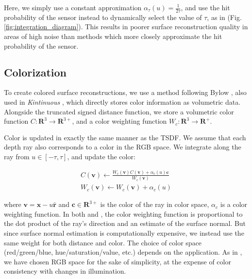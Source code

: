 \documentclass[10pt,twocolumn,letterpaper]{article}
\newcommand{\figref}[1]{Fig.\ref{#1}}
\begin{document}
Here, we simply use a constant approximation $\alpha_{\tau}(u) = \frac{1}{2
\tau}$, and use the hit probability of the sensor instead to  dynamically select
the value of $\tau$, as in \cite{Nguyen2012} (\figref{fig:integration_diagram}).
This results in poorer surface reconstruction quality in areas of high noise
than methods which more closely approximate the hit probability of the sensor.

\subsection{Colorization}
\label{section:color}
To create colored surface reconstructions, we use a method following Bylow
\etal \cite{Bylow2013}, also used in \textit{Kintinuous} \cite{Whelan2013},
which directly stores color information as volumetric data. Alongside the
truncated signed distance function, we store a volumetric color function
$C : \mathbf{R}^3 \to \mathbf{R}^{3+}$, and a color weighting function
$W_{c} :
\mathbf{R}^3 \to \mathbf{R^{+}}$.

Color is updated in exactly the same manner as the TSDF. We assume that each
depth ray also corresponds to a color in the RGB space. We integrate along the
ray from $u \in [-\tau, \tau]$, and update the color:

\begin{align}
C(\mathbf{v}) \gets \frac{W_c(\mathbf{v}) C(\mathbf{v}) +
\alpha_c(u) \mathbf{c}}{W_c(\mathbf{v})}
\\
%
W_c(\mathbf{v}) \gets W_c(\mathbf{v}) + \alpha_c(u)
\end{align}

\noindent where $\mathbf{v} = \mathbf{x} - u\mathbf{\hat{r}}$ and $\mathbf{c}
\in \mathbf{R}^{3+}$ is the color of the ray in color space, $\alpha_c$ is a
color weighting function. In both \cite{Bylow2013} and \cite{Whelan2013}, the color weighting function is proportional to the dot
product of the ray's direction and an estimate of the surface normal. But since
surface normal estimation is computationally expensive, we instead use the same
weight for both distance and color. The choice of color space (red/green/blue,
hue/saturation/value, etc.) depends on the application. As in \cite{Bylow2013}, we have chosen RGB space for the sake
of simplicity, at the expense of color consistency with changes in illumination.

\end{document}
